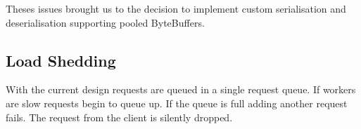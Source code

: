 \documentclass[milestone1.tex]{subfiles}
\begin{document}
Theses issues brought us to the decision to implement custom serialisation and deserialisation supporting pooled ByteBuffers.

\subsection{Load Shedding}
With the current design requests are queued in a single request queue. If workers are slow requests begin to queue up. If the queue is full adding another request fails. The request from the client is silently dropped.
\end{document}
